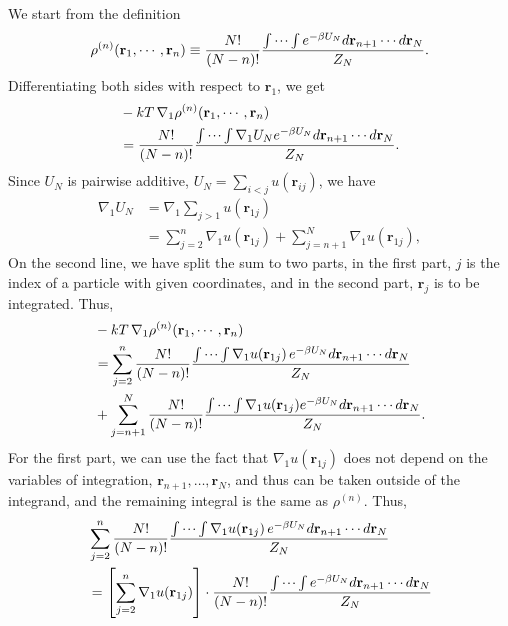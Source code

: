 \documentclass[twocolumn, 10pt]{article}
\numberwithin{equation}{section}
\newenvironment{solution}[1][\empty]
{\par\medskip\sffamily
  \textbf{\ifx\empty#1{Solution.}\relax\else{#1}\fi} \ignorespaces}
{\medskip}
\begin{document}
\begin{solution}
We start from the definition
$$
  \rho^{(n)}(\mathbf r_1, \cdots, \mathbf r_n)
  \equiv
  \frac{N!}{(N-n)!}
  \frac{
    \idotsint
    e^{-\beta U_N} d\mathbf r_{n+1} \cdots d\mathbf r_N
  }
  { Z_N }
  .
$$
Differentiating both sides with respect to $\mathbf r_1$,
we get
\begin{align*}
  &-kT \, \nabla_1 \rho^{(n)}(\mathbf r_1, \cdots, \mathbf r_n)
  \\
  &=
  \frac{N!}{(N-n)!}
  \frac{
  \idotsint
  \nabla_1 U_N
  e^{-\beta U_N} d\mathbf r_{n+1} \cdots d\mathbf r_N
  }
  { Z_N }
  .
\end{align*}
Since $U_N$ is pairwise additive,
$U_N = \sum_{i<j} u(\mathbf r_{ij})$,
we have
\begin{align*}
  \nabla_1 U_N
  &= \nabla_1 \sum_{j > 1} u(\mathbf r_{1j})
  \\
  &= \sum_{j=2}^n \nabla_1 u(\mathbf r_{1j})
  + \sum_{j=n+1}^N \nabla_1 u(\mathbf r_{1j})
  ,
\end{align*}
On the second line, we have split the sum to
two parts,
in the first part, $j$ is the index
of a particle with given coordinates,
and in the second part,
$\mathbf r_j$ is to be integrated.
%
Thus,
\begin{align}
  &-kT \, \nabla_1 \rho^{(n)}(\mathbf r_1, \cdots, \mathbf r_n)
  \notag \\
  &=
  \sum_{j=2}^n
  \frac{ N! } { (N-n)! }
  \frac{
    \idotsint
    \nabla_1 u(\mathbf r_{1j}) \,
    e^{-\beta U_N} d\mathbf r_{n+1} \cdots d\mathbf r_N
  }{ Z_N }
  \notag \\
  &+
  \sum_{j=n+1}^N
  \frac{ N! } { (N-n)! }
  \frac{
    \idotsint
    \nabla_1 u(\mathbf r_{1j})
    e^{-\beta U_N} d\mathbf r_{n+1} \cdots d\mathbf r_N
  } { Z_N }
  .
  \label{eq:rhon_BGYb}
\end{align}
%
For the first part,
we can use the fact that $\nabla_1 u(\mathbf r_{1j})$
does not depend on the variables of integration,
$\mathbf r_{n+1}, \dots, \mathbf r_{N}$,
and thus can be taken outside of the integrand,
and the remaining integral is the same as $\rho^{(n)}$.
%
Thus,
\begin{align}
  &\sum_{j=2}^n
  \frac{ N! } { (N-n)! }
  \frac{
    \idotsint
    \nabla_1 u(\mathbf r_{1j}) \,
    e^{-\beta U_N} d\mathbf r_{n+1} \cdots d\mathbf r_N
  }{ Z_N }
  \notag \\
  &=
  \left[
    \sum_{j=2}^n
    \nabla_1 u(\mathbf r_{1j})
  \right]
  \cdot
  \frac{ N! } { (N-n)! }
  \frac{
    \idotsint
    e^{-\beta U_N} d\mathbf r_{n+1} \cdots d\mathbf r_N
  }{ Z_N }
  \notag \\

\end{align}
\end{solution}
\end{document}
